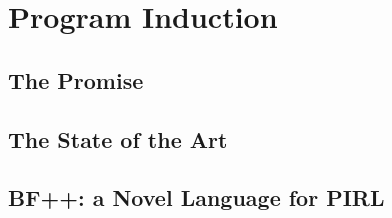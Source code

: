 \usepackage{lipsum}




\coverpage{\TITLE}{\SUBTITLE}{\AUTHOR}{\DATE}{\SUBJECT}

\newpage



\tableofcontents

\listoffigures

\listoftables


\printnomenclature

\part{Program Induction}
\newpage
\chapter{The Promise} \label{ch:autocode-motiv}

\newpage
\chapter{The State of the Art}\label{ch:autocode-sota}


\newpage
\chapter{BF++: a Novel Language for PIRL \protect\cite{liventsev2021:bf}}\label{ch:bfpp}



